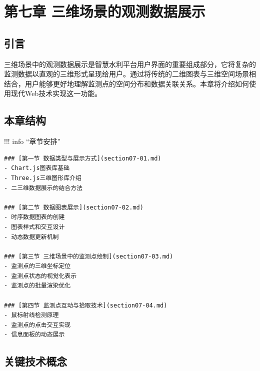 \hypertarget{ux7b2cux4e03ux7ae0-ux4e09ux7ef4ux573aux666fux7684ux89c2ux6d4bux6570ux636eux5c55ux793a}{%
\section{第七章 三维场景的观测数据展示}\label{ux7b2cux4e03ux7ae0-ux4e09ux7ef4ux573aux666fux7684ux89c2ux6d4bux6570ux636eux5c55ux793a}}


\hypertarget{ux5f15ux8a00}{%
\subsection{引言}\label{ux5f15ux8a00}}

三维场景中的观测数据展示是智慧水利平台用户界面的重要组成部分，它将复杂的监测数据以直观的三维形式呈现给用户。通过将传统的二维图表与三维空间场景相结合，用户能够更好地理解监测点的空间分布和数据关联关系。本章将介绍如何使用现代Web技术实现这一功能。

\hypertarget{ux672cux7ae0ux7ed3ux6784}{%
\subsection{本章结构}\label{ux672cux7ae0ux7ed3ux6784}}

!!! info ``章节安排''

\begin{verbatim}
### [第一节 数据类型与展示方式](section07-01.md)
- Chart.js图表库基础
- Three.js三维图形库介绍
- 二三维数据展示的结合方法

### [第二节 数据图表展示](section07-02.md)
- 时序数据图表的创建
- 图表样式和交互设计
- 动态数据更新机制

### [第三节 三维场景中的监测点绘制](section07-03.md)
- 监测点的三维坐标定位
- 监测点状态的视觉化表示
- 监测点的批量渲染优化

### [第四节 监测点互动与拾取技术](section07-04.md)
- 鼠标射线检测原理
- 监测点的点击交互实现
- 信息面板的动态展示
\end{verbatim}

\hypertarget{ux5173ux952eux6280ux672fux6982ux5ff5}{%
\subsection{关键技术概念}\label{ux5173ux952eux6280ux672fux6982ux5ff5}}

